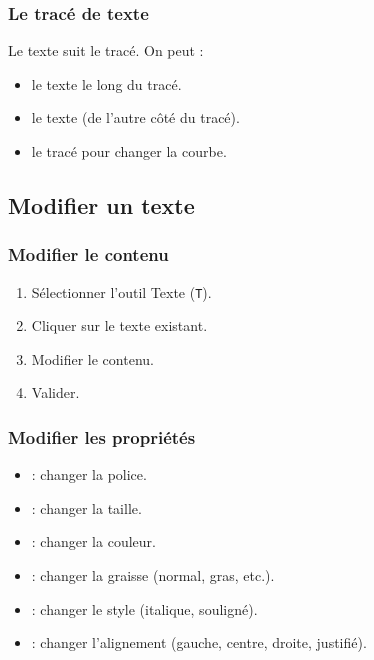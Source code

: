\subsubsection{Le tracé de texte}

Le texte suit le tracé. On peut :

\begin{itemize}
    \item {} le texte le long du tracé.
    \item {} le texte (de l'autre côté du tracé).
    \item {} le tracé pour changer la courbe.
\end{itemize}

\subsection{Modifier un texte}

\subsubsection{Modifier le contenu}

\begin{enumerate}
    \item Sélectionner l'outil Texte (\texttt{T}).
    \item Cliquer sur le texte existant.
    \item Modifier le contenu.
    \item Valider.
\end{enumerate}

\subsubsection{Modifier les propriétés}

\begin{itemize}
    \item {} : changer la police.
    \item {} : changer la taille.
    \item {} : changer la couleur.
    \item {} : changer la graisse (normal, gras, etc.).
    \item {} : changer le style (italique, souligné).
    \item {} : changer l'alignement (gauche, centre, droite, justifié).
\end{itemize}

